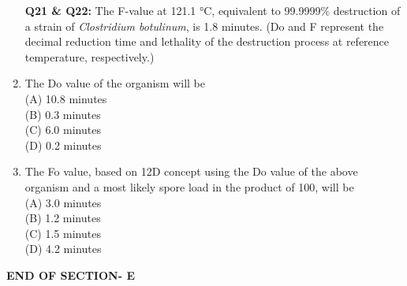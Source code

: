 \documentclass[journal,12pt,onecolumn]{IEEEtran}
\begin{document}
\begin{enumerate}
\item[\textbf{Q21 \& Q22:}] The F-value at 121.1 °C, equivalent to 99.9999\% destruction of a strain of \textit{Clostridium botulinum}, is 1.8 minutes.  
(Do and F represent the decimal reduction time and lethality of the destruction process at reference temperature, respectively.)
\vspace{0.3cm}

\item The Do value of the organism will be
\vspace{0.2cm}
\hfill{} \\
(A) 10.8 minutes \\
(B) 0.3 minutes \\
(C) 6.0 minutes \\
(D) 0.2 minutes

\vspace{0.5cm}

\item The Fo value, based on 12D concept using the Do value of the above organism and a most likely spore load in the product of 100, will be
\vspace{0.2cm}
\hfill{} \\
(A) 3.0 minutes \\
(B) 1.2 minutes \\
(C) 1.5 minutes \\
(D) 4.2 minutes
\vspace{0.5cm}

\end{enumerate}

\vspace{3\baselineskip}
    \begin{center}
    \textbf{\Large END OF SECTION- E}
    \end{center}
\end{document}
